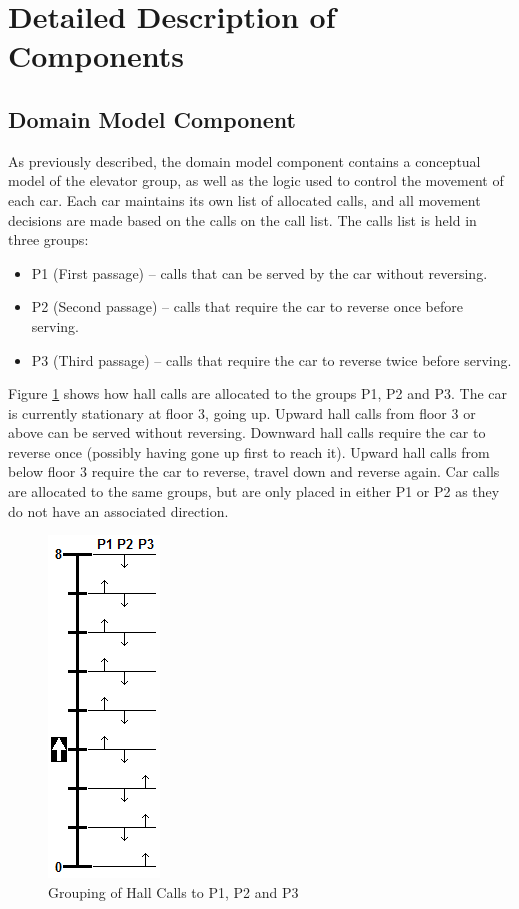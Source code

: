 \documentclass{UoYCSproject}
\begin{document}
\section{Detailed Description of Components}

\subsection{Domain Model Component}

As previously described, the domain model component contains a conceptual model of the elevator group, as well as the logic used to control the movement of each car.  Each car maintains its own list of allocated calls, and all movement decisions are made based on the calls on the call list.  The calls list is held in three groups:
\begin{itemize}
	\item P1 (First passage) -- calls that can be served by the car without reversing.
	\item P2 (Second passage) -- calls that require the car to reverse once before serving.
	\item P3 (Third passage) -- calls that require the car to reverse twice before serving.
\end{itemize}

Figure \ref{p1p2p3} shows how hall calls are allocated to the groups P1, P2 and P3.  The car is currently stationary at floor 3, going up.  Upward hall calls from floor 3 or above can be served without reversing.  Downward hall calls require the car to reverse once (possibly having gone up first to reach it).  Upward hall calls from below floor 3 require the car to reverse, travel down and reverse again.  Car calls are allocated to the same groups, but are only placed in either P1 or P2 as they do not have an associated direction.

\begin{figure} [h]
	\centering
	\includegraphics{P1_P2_P3_illustration.png}
	\caption{Grouping of Hall Calls to P1, P2 and P3}
	\label{p1p2p3}
\end{figure}
\end{document}
